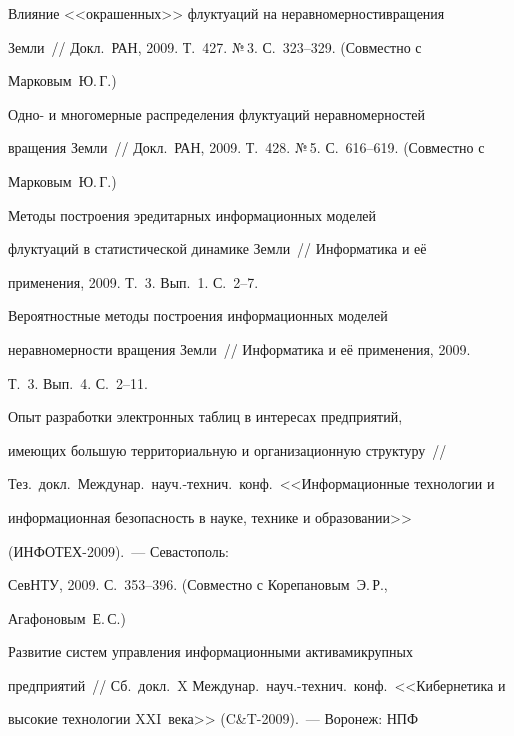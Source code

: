  Влияние <<окрашенных>> флуктуаций на неравномерности\linebreak вращения


Земли~// Докл.\ РАН, 2009. Т.~427. №\,3. С.~323--329. (Совместно с


Марковым~Ю.\,Г.)





 Одно- и многомерные распределения флуктуаций неравномерностей


вращения Земли~// Докл.\ РАН, 2009. Т.~428. №\,5. С.~616--619. (Совместно с


Марковым~Ю.\,Г.)





 Методы построения эредитарных информационных моделей


флуктуаций в статистической динамике Земли~// Информатика и её


применения, 2009. Т.~3. Вып.~1. С.~2--7.





 Вероятностные методы построения информационных моделей


неравномерности вращения Земли~// Информатика и её применения, 2009.


Т.~3. Вып.~4. С.~2--11.





 Опыт разработки электронных таблиц в интересах предприятий,


имеющих большую территориальную и организационную структуру~//


Тез.\ докл.\ Междунар.\ науч.-технич.\ конф.\ <<Информационные технологии и


информационная безопасность в науке, технике и образовании>>


(ИНФОТЕХ-2009).~--- Севастополь:


СевНТУ, 2009. С.~353--396. (Совместно с Корепановым~Э.\,Р.,


Агафоновым~Е.\,С.)





 Развитие систем управления информационными активами\linebreak крупных


предприятий~// Сб.\ докл.\ X Междунар.\ науч.-технич.\ конф.\ <<Кибернетика и


высокие технологии XXI~века>> (C\&T-2009).~--- Воронеж: НПФ


